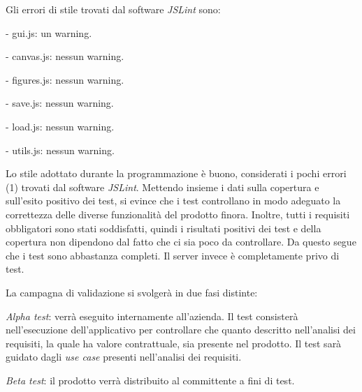 Gli errori di stile trovati dal software \textit{JSLint} sono:
\begin{elencopuntato}[\subsubsecindent]
\item[-] gui.js: un warning.
\item[-] canvas.js: nessun warning.
\item[-] figures.js: nessun warning.
\item[-] save.js: nessun warning.
\item[-] load.js: nessun warning.
\item[-] utils.js: nessun warning.
\end{elencopuntato}

 Lo stile adottato durante la programmazione \`e buono, considerati i pochi errori (1) trovati dal software \textit{JSLint}. Mettendo insieme i dati sulla copertura e sull'esito positivo dei test, si evince che i test controllano in modo adeguato la correttezza delle diverse funzionalit\`a del prodotto finora. Inoltre, tutti i requisiti obbligatori sono stati soddisfatti, quindi i risultati positivi dei test e della copertura non dipendono dal fatto che ci sia poco da controllare. Da questo segue che i test sono abbastanza completi. Il server invece \`e completamente privo di test.

 
 
 
La campagna di validazione si svolger\`a in due fasi distinte:
\begin{elenconumerato}[\textbf{}]{\subsubsecindent}
\item \textit{Alpha test}: verr\`a eseguito internamente all'azienda. Il test consister\`a nell'esecuzione dell'applicativo per controllare che quanto descritto nell'analisi dei requisiti, la quale ha valore contrattuale, sia presente nel prodotto. Il test sar\`a guidato dagli \textit{use case} presenti nell'analisi dei requisiti.
\item \textit{Beta test}: il prodotto verr\`a distribuito al committente a fini di test.
\end{elenconumerato}
 

 
